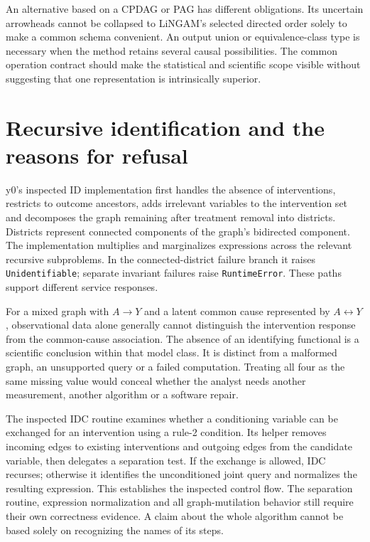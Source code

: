 An alternative based on a CPDAG or PAG has different obligations. Its uncertain
arrowheads cannot be collapsed to LiNGAM's selected directed order solely to
make a common schema convenient. An output union or equivalence-class type is
necessary when the method retains several causal possibilities. The common
operation contract should make the statistical and scientific scope visible
without suggesting that one representation is intrinsically superior.

\section{Recursive identification and the reasons for refusal}

y0's inspected ID implementation first handles the absence of interventions,
restricts to outcome ancestors, adds irrelevant variables to the intervention
set and decomposes the graph remaining after treatment removal into districts.
Districts represent connected components of the graph's bidirected component.
The implementation multiplies and marginalizes expressions across the relevant
recursive subproblems. In the connected-district failure branch it raises
\texttt{Unidentifiable}; separate invariant failures raise \texttt{RuntimeError}.
These paths support different service responses.\cite{v131_sw_y0}

For a mixed graph with $A\to Y$ and a latent common cause represented by
$A\leftrightarrow Y$, observational data alone generally cannot distinguish
the intervention response from the common-cause association. The absence of an
identifying functional is a scientific conclusion within that model class.
It is distinct from a malformed graph, an unsupported query or a failed
computation. Treating all four as the same missing value would conceal whether
the analyst needs another measurement, another algorithm or a software repair.

The inspected IDC routine examines whether a conditioning variable can be
exchanged for an intervention using a rule-2 condition. Its helper removes
incoming edges to existing interventions and outgoing edges from the candidate
variable, then delegates a separation test. If the exchange is allowed, IDC
recurses; otherwise it identifies the unconditioned joint query and normalizes
the resulting expression. This establishes the inspected control flow. The
separation routine, expression normalization and all graph-mutilation behavior
still require their own correctness evidence. A claim about the whole algorithm
cannot be based solely on recognizing the names of its steps.
\cite{v131_sw_y0}

